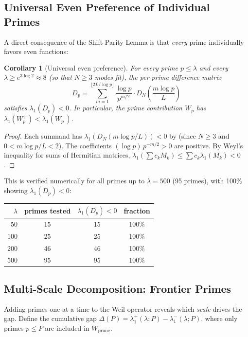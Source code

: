 \documentclass[12pt,a4paper]{article}
\newtheorem{corollary}[theorem]{Corollary}
\theoremstyle{definition}
\theoremstyle{remark}
\begin{document}
\subsection{Universal Even Preference of Individual Primes}

A direct consequence of the Shift Parity Lemma is that \emph{every} prime individually favors even functions:

\begin{corollary}[Universal even preference]
\label{cor:universal}
For every prime $p \leq \lambda$ and every $\lambda \geq e^{3\log 2} \approx 8$ (so that $N \geq 3$ modes fit), the per-prime difference matrix
\[
  D_p = \sum_{m=1}^{\lfloor 2L/\log p \rfloor} \frac{\log p}{p^{m/2}} \cdot D_N\!\left(\frac{m\log p}{L}\right)
\]
satisfies $\lambda_1(D_p) < 0$. In particular, the prime contribution $W_p$ has $\lambda_1(W_p^+) < \lambda_1(W_p^-)$.
\end{corollary}

\begin{proof}
Each summand has $\lambda_1(D_N(m\log p/L)) < 0$ by  (since $N \geq 3$ and $0 < m\log p/L < 2$). The coefficients $(\log p)\,p^{-m/2} > 0$ are positive. By Weyl's inequality for sums of Hermitian matrices, $\lambda_1(\sum c_k M_k) \leq \sum c_k \lambda_1(M_k) < 0$.
\end{proof}

This is verified numerically for all primes up to $\lambda = 500$ (95 primes), with 100\% showing $\lambda_1(D_p) < 0$:

\begin{center}
\renewcommand{\arraystretch}{1.15}
\begin{tabular}{r|c|c|c}
$\lambda$ & primes tested & $\lambda_1(D_p) < 0$ & fraction \\\hline
50 & 15 & 15 & 100\% \\
100 & 25 & 25 & 100\% \\
200 & 46 & 46 & 100\% \\
500 & 95 & 95 & 100\%
\end{tabular}
\end{center}

\subsection{Multi-Scale Decomposition: Frontier Primes}
\label{sec:frontier}

Adding primes one at a time to the Weil operator reveals which \emph{scale} drives the gap. Define the cumulative gap $\Delta(P) = \lambda_1^+(\lambda; P) - \lambda_1^-(\lambda; P)$, where only primes $p \leq P$ are included in $W_{\mathrm{prime}}$.
\end{document}
